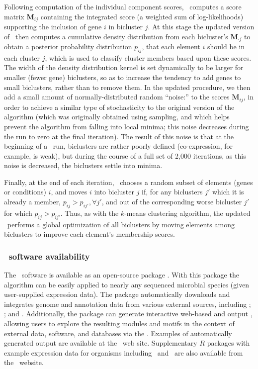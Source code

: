 Following computation of the individual component scores, \cm\ computes a score matrix $\mathbf{M}_{ij}$ containing the integrated score (a weighted sum of log-likelihoods) supporting the inclusion of gene $i$ in bicluster $j$. At this stage the updated version of \cm\ then computes a cumulative density distribution from each bicluster's $\mathbf{M}_{\cdot j}$ to obtain a posterior probability distribution $p_{ij}$, that each element $i$ should be in each cluster $j$, which is used to classify cluster members based upon these scores. The width of the density distribution kernel is set dynamically to be larger for smaller (fewer gene) biclusters, so as to increase the tendency to add genes to small biclusters, rather than to remove them. In the updated procedure, we then add a small amount of normally-distributed random ``noise:'' to the scores $\mathbf{M}_{ij}$, in order to achieve a similar type of stochasticity to the original version of the algorithm (which was originally obtained using sampling, and which helps prevent the algorithm from falling into local minima; this noise decreases during the run to zero at the final iteration). The result of this noise is that at the beginning of a \cm\ run, biclusters are rather poorly defined (co-expression, for example, is weak), but during the course of a full set of 2,000 iterations, as this noise is decreased, the biclusters settle into minima.

Finally, at the end of each iteration, \cm\ chooses a random subset of elements (genes or conditions) $i$, and moves $i$ into bicluster $j$ if, for any biclusters $j'$ which it is already a member, $p_{ij} > p_{ij'}, \forall j'$, and out of the corresponding worse bicluster $j'$ for which $p_{ij} > p_{ij'}$. Thus, as with the $k$-means clustering algorithm, the updated \cm\ performs a global optimization of all biclusters by moving elements among biclusters to improve each element's membership scores.

\subsubsection{\cm\ software availability}

The \cm\ software is available as an open-source  package \cite{ihaka_r:_1996}.  With this package the algorithm can be easily applied to nearly any sequenced microbial species (given user-supplied expression data). The package automatically downloads and integrates genome and annotation data from various external sources, including  \cite{van_helden_web_2000};  \cite{alm_microbesonline_2005}; and  \cite{szklarczyk_string_2011}. Additionally, the package can generate interactive web-based and  output \cite{shannon_cytoscape:_2003}, allowing users to explore the resulting modules and motifs in the context of external data, software, and databases via the  \cite{shannon_gaggle:_2006}. Examples of automatically generated output are available at the \cm\ web site. Supplementary $R$ packages with example expression data for organisms including \halo\ and \eco\ are also available from the \cm\ website.

